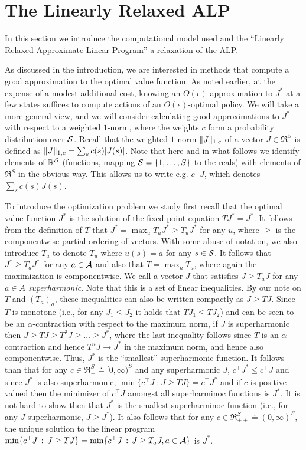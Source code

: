 \section{The Linearly Relaxed ALP}\label{sec:grlp}
In this section we introduce the computational model used and the ``Linearly Relaxed Approximate Linear Program''
a relaxation of the ALP.

As discussed in the introduction, we are interested in methods that compute a good approximation to the optimal value function.
As noted earlier, at the expense of a modest additional cost, knowing an $O(\epsilon)$ approximation to $J^*$ at a few states suffices to compute actions of an $O(\epsilon)$-optimal policy. We will take a more general view, and we will consider calculating good approximations to $J^*$ with respect to a weighted $1$-norm, where the weights $c$ form a probability distribution over $\S$. Recall that the weighted $1$-norm $\norm{J}_{1,c}$ of a vector $J\in \Re^S$ is defined as $\norm{J}_{1,c}  = \sum_s c(s) |J(s)|$. Note that here and in what follows we identify elements of $\Re^\S$ (functions, mapping $\S = \{1,\dots,S\}$ to the reals) with elements of $\Re^S$ in the obvious way. This allows us to write e.g. $c^\top J$, which denotes $\sum_s c(s) J(s)$.

To introduce the optimization problem we study first recall that 
the optimal value function $J^*$ is the solution of the fixed point equation $TJ^* = J^*$. 
It follows from the definition of $T$ that $J^* = \max_u T_u J^* \ge T_u J^*$ for any $u$, 
where $\ge$ is the componentwise partial ordering of vectors. 
With some abuse of notation, we also introduce $T_a$ to denote $T_u$ where $u(s) = a$ for any $s\in \S$. 
It follows that $J^* \ge T_a J^*$ for any $a\in \A$ and also that $T = \max_a T_a$, where again the maximization is componentwise.
We call a vector $J$ that satisfies $J \ge T_a J$ for any $a\in A$ \emph{superharmonic}. Note that this is a set of linear inequalities. 
By our note on $T$ and $(T_a)_a$, these inequalities can also be written compactly as $J \ge T J$.
Since $T$ is monotone (i.e., for any $J_1\le J_2$ it holds that $TJ_1 \le T J_2$) and can be seen to be an $\alpha$-contraction with respect to the maximum norm, if $J$ is superharmonic then $J \ge T J \ge T^2 J \ge \dots \ge J^*$, where the last inequality follows since $T$ is an $\alpha$-contraction and hence $T^n J \to J^*$ in the maximum norm, and hence also componentwise.
Thus, $J^*$ is the ``smallest'' superharmonic function. It follows than that 
for any $c\in \Re_+^S \doteq [0,\infty)^S$ and any superharmonic $J$, $c^\top J^*\le c^\top J$ and since $J^*$ is also superharmonic, $\min \{ c^\top J\,:\, J \ge T J \} = c^\top J^*$ and if $c$ is positive-valued then the minimizer of $c^\top J$ amongst all superharminoc functions is $J^*$.
\fi
It is not hard to show then that $J^*$ is the smallest superharminoc function (i.e., for any $J$ superharmonic, $J\ge J^*$). It also follows that for any  $c\in \Re_{++}^S \doteq (0,\infty)^S$, the unique solution to the linear program $\min\{ c^\top J \,:\, J \ge T J \} =\min \{ c^\top J\,:\, J \ge T_a J, a\in \A \} $ is $J^*$. 

